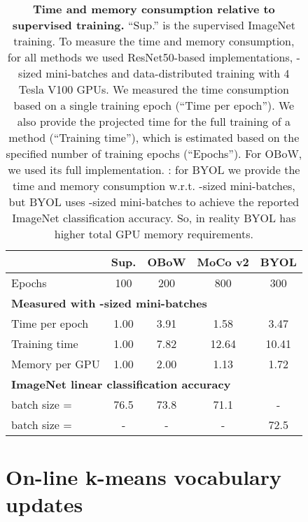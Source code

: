 \documentclass[final]{cvpr}
\newcommand{\resnetfifty}{ResNet50\xspace}
\begin{document}
\begin{table}[t!]
\centering
\renewcommand{\figurename}{Table}
\renewcommand{\captionlabelfont}{\bf}
\renewcommand{\captionfont}{\small} 
{\setlength{\extrarowheight}{2pt}\small
{
\begin{tabular}{ l | c c c c }
\toprule
& \multicolumn{1}{r}{Sup.} & \multicolumn{1}{r}{OBoW} & \multicolumn{1}{r}{MoCo v2} & \multicolumn{1}{r}{BYOL}\\
\midrule
\;Epochs           & 100 & 200 & 800 & 300\\
\midrule
\multicolumn{5}{l}{\textbf{Measured with -sized mini-batches}} \\
\;Time per epoch     & 1.00 & 3.91 &  1.58 &  3.47\\
\;Training time      & 1.00 & 7.82 & 12.64 & 10.41\\
\;Memory per GPU     & 1.00 & 2.00 &  1.13 &  1.72\\
\midrule
\multicolumn{5}{l}{\textbf{ImageNet linear classification accuracy}} \\
\;batch size =   & \multicolumn{1}{c}{76.5} & \multicolumn{1}{c}{73.8} & \multicolumn{1}{c}{71.1}  & \multicolumn{1}{c}{-}\\
\;batch size =  & \multicolumn{1}{c}{-} & \multicolumn{1}{c}{-} &  \multicolumn{1}{c}{-} & \multicolumn{1}{c}{72.5}\\
\bottomrule
\end{tabular}}}
\vspace{-8pt}
\caption{\textbf{Time and memory consumption relative to supervised training.}
``Sup.'' is the supervised ImageNet training.
To measure the time and memory consumption, for all methods we used \resnetfifty-based implementations, -sized mini-batches and data-distributed training with 4 Tesla V100 GPUs.
We measured the time consumption based on a single training epoch (``Time per epoch''). 
We also provide the projected time for the full training of a method (``Training time''), which is estimated based on the specified number of training epochs (``Epochs''). 
For OBoW, we used its full implementation. 
: for BYOL we provide the time and memory consumption w.r.t. -sized mini-batches, but BYOL uses -sized mini-batches to achieve the reported ImageNet classification accuracy.
So, in reality BYOL has higher total GPU memory requirements.
}
\vspace{-8pt}
\label{tab:complexity_comparison}
\end{table}

\section{On-line k-means vocabulary updates} \label{sec:appendix_online_kmeans}
\end{document}
